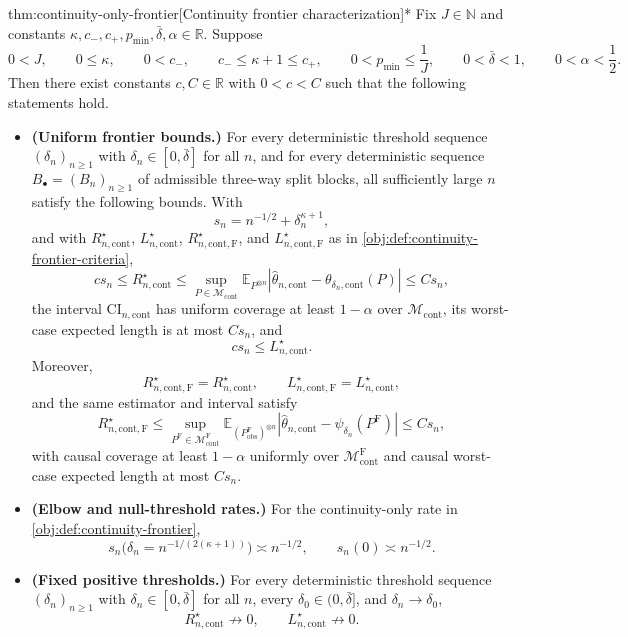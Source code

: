 \documentclass[11pt]{article}
\begin{document}
\begin{theoremv}{thm:continuity-only-frontier}[Continuity frontier characterization]*
Fix \(J\in\mathbb N\) and constants \(\kappa,c_-,c_+,p_{\min},\bar\delta,\alpha\in\mathbb R\). Suppose
\[
0<J,
\qquad
0\leq \kappa,
\qquad
0<c_-,
\qquad
c_-\leq \kappa+1\leq c_+,
\qquad
0<p_{\min}\leq \frac{1}{J},
\qquad
0<\bar\delta<1,
\qquad
0<\alpha<\frac12.
\]
Then there exist constants \(c,C\in\mathbb R\) with \(0<c<C\) such that the following statements hold.

\begin{itemize}
\item \textbf{(Uniform frontier bounds.)} For every deterministic threshold sequence \((\delta_n)_{n\geq1}\) with \(\delta_n\in[0,\bar\delta]\) for all \(n\), and for every deterministic sequence \(B_{\bullet}=(B_n)_{n\geq1}\) of admissible three-way split blocks, all sufficiently large \(n\) satisfy the following bounds. With
\[
s_n=n^{-1/2}+\delta_n^{\kappa+1},
\]
and with \(R_{n,\mathrm{cont}}^\star\), \(L_{n,\mathrm{cont}}^\star\), \(R_{n,\mathrm{cont},\mathrm F}^\star\), and \(L_{n,\mathrm{cont},\mathrm F}^\star\) as in \cref{obj:def:continuity-frontier-criteria},
\[
c s_n\leq R_{n,\mathrm{cont}}^\star
\leq
\sup_{P\in\mathcal M_{\mathrm{cont}}}
\mathbb E_{P^{\otimes n}}
\left|\widehat\theta_{n,\mathrm{cont}}-\theta_{\delta_n,\mathrm{cont}}(P)\right|
\leq C s_n,
\]
the interval \(\mathrm{CI}_{n,\mathrm{cont}}\) has uniform coverage at least \(1-\alpha\) over \(\mathcal M_{\mathrm{cont}}\), its worst-case expected length is at most \(C s_n\), and
\[
c s_n\leq L_{n,\mathrm{cont}}^\star.
\]
Moreover,
\[
R_{n,\mathrm{cont},\mathrm F}^\star=R_{n,\mathrm{cont}}^\star,
\qquad
L_{n,\mathrm{cont},\mathrm F}^\star=L_{n,\mathrm{cont}}^\star,
\]
and the same estimator and interval satisfy
\[
R_{n,\mathrm{cont},\mathrm F}^\star
\leq
\sup_{P^{\mathrm F}\in\mathcal M_{\mathrm{cont}}^{\mathrm F}}
\mathbb E_{(P^{\mathrm F}_{\mathrm{obs}})^{\otimes n}}
\left|\widehat\theta_{n,\mathrm{cont}}-\psi_{\delta_n}(P^{\mathrm F})\right|
\leq C s_n,
\]
with causal coverage at least \(1-\alpha\) uniformly over \(\mathcal M_{\mathrm{cont}}^{\mathrm F}\) and causal worst-case expected length at most \(C s_n\).

\item \textbf{(Elbow and null-threshold rates.)} For the continuity-only rate in \cref{obj:def:continuity-frontier},
\[
s_n\bigl(\delta_n=n^{-1/(2(\kappa+1))}\bigr)
\asymp n^{-1/2},
\qquad
s_n(0)\asymp n^{-1/2}.
\]

\item \textbf{(Fixed positive thresholds.)} For every deterministic threshold sequence \((\delta_n)_{n\geq1}\) with \(\delta_n\in[0,\bar\delta]\) for all \(n\), every \(\delta_0\in(0,\bar\delta]\), and \(\delta_n\to\delta_0\),
\[
R_{n,\mathrm{cont}}^\star \not\to 0,
\qquad
L_{n,\mathrm{cont}}^\star \not\to 0.
\]
\end{itemize}
\end{theoremv}
\end{document}
